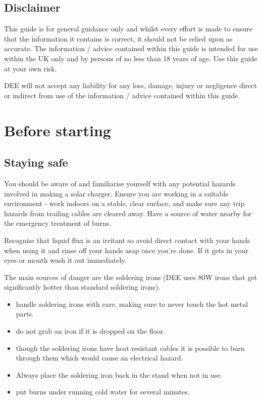 \documentclass{article}
\theoremstyle{definition}
\theoremstyle{definition}
\theoremstyle{remark}
\begin{document}
  
  \subsection{Disclaimer} %
  \label{sub:disclaimer}

    This guide is for general guidance only and whilst every effort is made to ensure that the information it contains is correct, it should not be relied upon as accurate. The information / advice contained within this guide is intended for use within the UK only and by persons of no less than 18 years of age. Use this guide at your own risk.
    
    DEE will not accept any liability for any loss, damage, injury or negligence direct or indirect from use of the information / advice contained within this guide.


  \newpage  


\section{Before starting} %
\label{sec:before_starting}

  \subsection{Staying safe} %
  \label{sub:staying_safe}

    You should be aware of and familiarise yourself with any potential hazards involved in making a solar charger. Ensure you are working in a suitable environment - work indoors on a stable, clear surface, and make sure any trip hazards from trailing cables are cleared away. Have a source of water nearby for the emergency treatment of burns.

    Recognise that liquid flux is an irritant so avoid direct contact with your hands when using it and rinse off your hands asap once you’re done. If it gets in your eyes or mouth wash it out immediately.

    The main sources of danger are the soldering irons (DEE uses 80W irons that get significantly hotter than standard soldering irons). 

    \begin{itemize}
      \item handle soldering irons with care, making sure to never touch the hot metal parts. 
      \item do not grab an iron if it is dropped on the floor. 
      \item though the soldering irons have heat resistant cables it is possible to burn through them which would cause an electrical hazard.
      \item Always place the soldering iron back in the stand when not in use.
      \item put burns under running cold water for several minutes. 
    \end{itemize}
\end{document}

